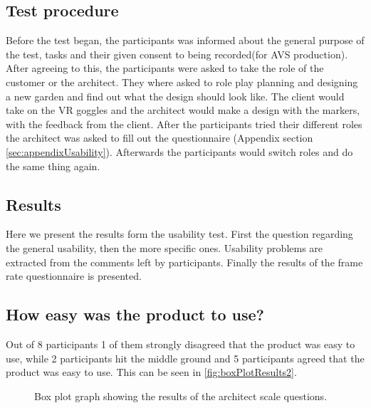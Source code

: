 \subsection*{Test procedure}
Before the test began, the participants was informed about the general purpose of the test, tasks and their given consent to being recorded(for AVS production). After agreeing to this, the participants were asked to take the role of the customer or the architect. They where asked to role play planning and designing a new garden and find out what the design should look like. The client would take on the VR goggles and the architect would make a design with the markers, with the feedback from the client. After the participants tried their different roles the architect was asked to fill out the questionnaire (Appendix section \ref{sec:appendixUsability}). Afterwards the participants would switch roles and do the same thing again.
\subsection{Results}
Here we present the results form the usability test. First the question regarding the general usability, then the more specific ones. Usability problems are extracted from the comments left by participants. Finally the results of the frame rate questionnaire is presented.

\subsection*{How easy was the product to use?}
Out of 8 participants 1 of them strongly disagreed that the product was easy to use, while 2 participants hit the middle ground and 5 participants agreed that the product was easy to use. This can be seen in \autoref{fig:boxPlotResults2}.

\begin{figure}[H]
	\centering
	\caption{Box plot graph showing the results of the architect scale questions.}
	\label{fig:boxPlotResults2}
\end{figure}

